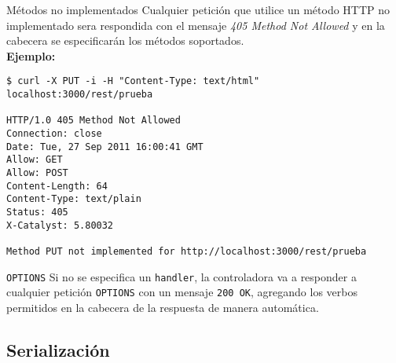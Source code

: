 \begin{frame}[fragile]{Métodos no implementados} %
    Cualquier petición que utilice un método HTTP no implementado sera
    respondida con el mensaje \textit{405 Method Not Allowed} y en la cabecera se
    especificarán los métodos soportados. \\[0.2cm]

    \textbf{Ejemplo:} 
   \footnotesize{
    \begin{verbatim}
$ curl -X PUT -i -H "Content-Type: text/html" localhost:3000/rest/prueba 

HTTP/1.0 405 Method Not Allowed
Connection: close
Date: Tue, 27 Sep 2011 16:00:41 GMT
Allow: GET
Allow: POST
Content-Length: 64
Content-Type: text/plain
Status: 405
X-Catalyst: 5.80032

Method PUT not implemented for http://localhost:3000/rest/prueba
    \end{verbatim}
    }

\end{frame}

\begin{frame}{\texttt{OPTIONS}} %
    Si no se especifica un \texttt{handler}, la controladora va a responder a
    cualquier petición \texttt{OPTIONS} con un mensaje \texttt{200 OK},
    agregando los verbos permitidos en la cabecera de la respuesta de manera
    automática.
\end{frame}


\subsection{Serialización} %

